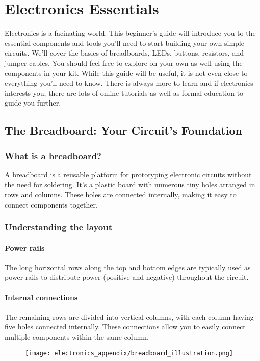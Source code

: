 \chapter{Electronics Essentials}
Electronics is a facinating world. This beginner's guide will introduce you to the essential
components and tools you'll need to start building your own simple circuits. We'll cover the
basics of breadboards, LEDs, buttons, resistors, and jumper cables. You should feel free to
explore on your own as well using the components in your kit. While this guide will be useful,
it is not even close to everything you'll need to know. There is always more to learn and if
electronics interests you, there are lots of online tutorials as well as formal education to
guide you further.

\section{The Breadboard: Your Circuit's Foundation}
\subsection{What is a breadboard?}

A breadboard is a reusable platform for prototyping electronic circuits without the need for
soldering. It's a plastic board with numerous tiny holes arranged in rows and columns. These holes
are connected internally, making it easy to connect components together.

\subsection{Understanding the layout}
\subsubsection{Power rails}
The long horizontal rows along the top and bottom edges are typically used as power rails to
distribute power (positive and negative) throughout the circuit.
\subsubsection{Internal connections}
The remaining rows are divided into vertical columns, with each column having five holes connected
internally. These connections allow you to easily connect multiple components within the same column.

\begin{figure}[H]
\centering
    \texttt{[image: electronics\_appendix/breadboard\_illustration.png]}
\end{figure}


